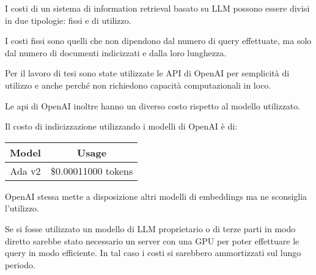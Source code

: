 I costi di un sistema di information retrieval basato su LLM possono essere divisi in due tipologie: fissi e di utilizzo.

I costi fissi sono quelli che non dipendono dal numero di query effettuate, ma solo dal numero di documenti indicizzati e dalla loro lunghezza.

Per il lavoro di tesi sono state utilizzate le API di OpenAI per semplicità di utilizzo e anche perché non richiedono capacità computazionali in loco.

Le api di OpenAI inoltre hanno un diverso costo rispetto al modello utilizzato. 

Il costo di indicizzazione utilizzando i modelli di OpenAI è di:

\begin{center}
    \begin{tabular}{|c|c|}
        \hline
        Model	& Usage \\
        \hline
        Ada v2	& \$0.0001\/1000 tokens \\
        \hline
    \end{tabular}
\end{center}

OpenAI stessa mette a disposizione altri modelli di embeddings ma ne sconsiglia l'utilizzo.


Se si fosse utilizzato un modello di LLM proprietario o di terze parti in modo diretto sarebbe stato necessario un server con una GPU per poter effettuare le query in modo efficiente. In tal caso i costi si sarebbero ammortizzati sul lungo periodo.



